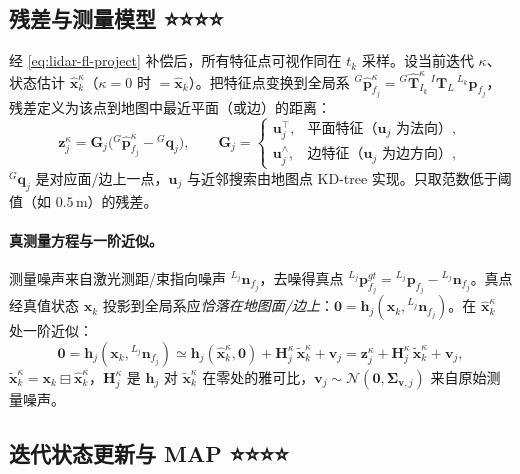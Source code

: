 \subsection{残差与测量模型 ⭐⭐⭐⭐}
\label{sec:lidar-fl-meas}

经 \cref{eq:lidar-fl-project} 补偿后，所有特征点可视作同在 $t_k$ 采样。设当前迭代 $\kappa$、状态估计 $\hat{\mathbf{x}}^\kappa_k$（$\kappa=0$ 时 $=\hat{\mathbf{x}}_k$）。把特征点变换到全局系 ${}^G\hat{\mathbf{p}}^\kappa_{f_j}={}^G\hat{\mathbf{T}}^\kappa_{I_k}\,{}^I\mathbf{T}_L\,{}^{L_k}\mathbf{p}_{f_j}$，残差定义为该点到地图中最近平面（或边）的距离\cite{xu2021fastlio}：
\begin{equation}
  \mathbf{z}^\kappa_j=\mathbf{G}_j\big({}^G\hat{\mathbf{p}}^\kappa_{f_j}-{}^G\mathbf{q}_j\big),\qquad
  \mathbf{G}_j=\begin{cases}\mathbf{u}_j^\top, & \text{平面特征（$\mathbf{u}_j$ 为法向）},\\ \mathbf{u}_j^\wedge, & \text{边特征（$\mathbf{u}_j$ 为边方向）},\end{cases}
  \label{eq:lidar-fl-residual}
\end{equation}
${}^G\mathbf{q}_j$ 是对应面/边上一点，$\mathbf{u}_j$ 与近邻搜索由地图点 KD-tree 实现。只取范数低于阈值（如 $0.5$\,m）的残差。

\paragraph{真测量方程与一阶近似。}
测量噪声来自激光测距/束指向噪声 ${}^{L_j}\mathbf{n}_{f_j}$，去噪得真点 ${}^{L_j}\mathbf{p}^{gt}_{f_j}={}^{L_j}\mathbf{p}_{f_j}-{}^{L_j}\mathbf{n}_{f_j}$。真点经真值状态 $\mathbf{x}_k$ 投影到全局系应\emph{恰落在地图面/边上}：$\mathbf{0}=\mathbf{h}_j(\mathbf{x}_k,{}^{L_j}\mathbf{n}_{f_j})$。在 $\hat{\mathbf{x}}^\kappa_k$ 处一阶近似：
\begin{equation}
  \mathbf{0}=\mathbf{h}_j(\mathbf{x}_k,{}^{L_j}\mathbf{n}_{f_j})\simeq\mathbf{h}_j(\hat{\mathbf{x}}^\kappa_k,\mathbf{0})+\mathbf{H}^\kappa_j\,\tilde{\mathbf{x}}^\kappa_k+\mathbf{v}_j=\mathbf{z}^\kappa_j+\mathbf{H}^\kappa_j\,\tilde{\mathbf{x}}^\kappa_k+\mathbf{v}_j,
  \label{eq:lidar-fl-linmeas}
\end{equation}
$\tilde{\mathbf{x}}^\kappa_k=\mathbf{x}_k\boxminus\hat{\mathbf{x}}^\kappa_k$，$\mathbf{H}^\kappa_j$ 是 $\mathbf{h}_j$ 对 $\tilde{\mathbf{x}}^\kappa_k$ 在零处的雅可比，$\mathbf{v}_j\sim\mathcal{N}(\mathbf{0},\boldsymbol{\Sigma}_{\mathbf{v},j})$ 来自原始测量噪声。

\subsection{迭代状态更新与 MAP ⭐⭐⭐⭐}
\label{sec:lidar-fl-update}

